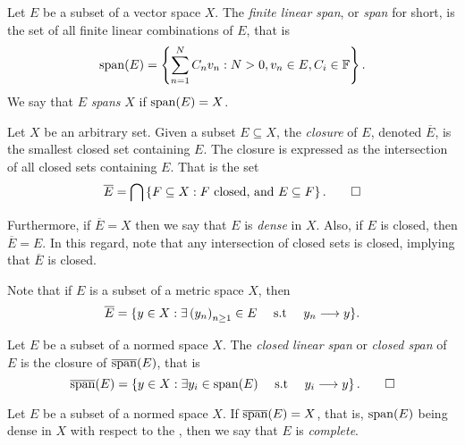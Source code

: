 \documentclass[../thesis.tex]{subfiles}
\begin{document}
\begin{definition}[Span]\label{def:span}
    Let $E$ be a subset of a vector space $X$. The \emph{finite linear span}, or \emph{span} for short, is the set of all finite linear combinations of $E$, that is
    \begin{equation*}
        \operatorname{span}(E)=\left\{\sum_{n=1}^N C_n v_n : N>0, v_n \in E, C_i \in \mathbb{F}\right\}.
    \end{equation*}
    We say that $E$ \emph{spans} $X$ if $\operatorname{span}(E) = X$.
\end{definition}

\begin{definition}[Closure]\label{def:closure}
    Let $X$ be an arbitrary set. Given a subset $E \subseteq X$, the \emph{closure} of $E$, denoted $\overline{E}$, is the smallest closed set containing $E$. The closure is expressed as the intersection of all closed sets containing $E$. That is the set
    \begin{equation*}
        \overline{E} = \bigcap \left\{F \subseteq X : F \text{ closed, and } E \subseteq F\right\}. \qedhere
    \end{equation*}
\end{definition}
Furthermore, if $\overline{E} = X$ then we say that $E$ is \emph{dense} in $X$. Also, if $E$ is closed, then $\overline{E}=E$. In this regard, note that any intersection of closed sets is closed, implying that $\overline{E}$ is closed.
\begin{remark}
    Note that if $E$ is a subset of a metric space $X$, then
    \begin{equation*}
        \overline{E} = \{ y \in X : \exists \space \left(y_n\right)_{n\geq 1} \in E \quad \text{ s.t }\quad y_n \longrightarrow y\}.
    \end{equation*}
\end{remark}

\begin{definition}\label{def:closed_span}
    Let $E$ be a subset of a normed space $X$. The \emph{closed linear span} or \emph{closed span} of $E$ is the closure of $\overline{\operatorname{span}}(E)$, that is
    \begin{equation*}
        \overline{\operatorname{span}}(E) = \left\{y\in X: \exists \space y_i\in \operatorname{span}(E) \quad \text{ s.t } \quad y_i \longrightarrow y\right\}. \qedhere
    \end{equation*}
\end{definition}

\begin{definition}[Complete]\label{def:complete}
    Let $E$ be a subset of a normed space $X$. If $\overline{\operatorname{span}}(E) = X$, that is, $\operatorname{span}(E)$ being dense in $X$ with respect to the \GenNormX, then we say that $E$ is \emph{complete}.  %
\end{definition}
\end{document}
